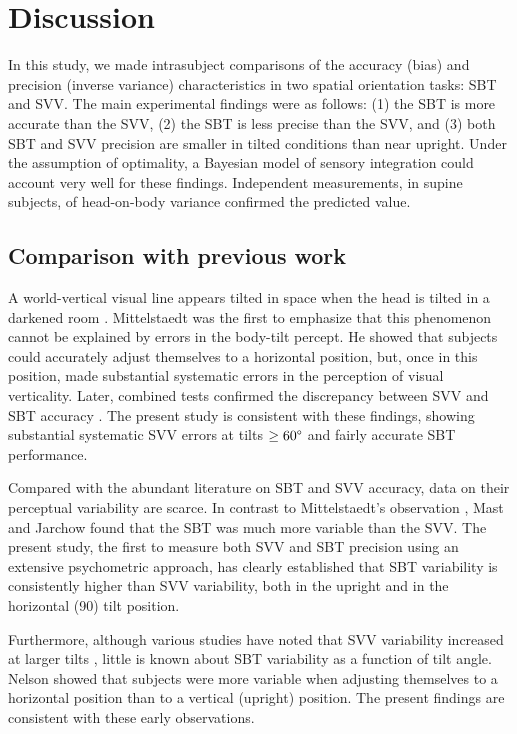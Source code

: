 \section{Discussion}

In this study, we made intrasubject comparisons of the accuracy (bias) and precision (inverse variance) characteristics in two spatial orientation tasks: SBT and SVV. The main experimental findings were as follows: (1) the SBT is more accurate than the SVV, (2) the SBT is less precise than the SVV, and (3) both SBT and SVV precision are smaller in tilted conditions than near upright. Under the assumption of optimality, a Bayesian model of sensory integration could account very well for these findings. Independent measurements, in supine subjects, of head-on-body variance confirmed the predicted value. 


\subsection{Comparison with previous work}
 
A world-vertical visual line appears tilted in space when the head is tilted in a darkened room \cite{aubert1861}. Mittelstaedt \citeyear{mittelstaedt1983} was the first to emphasize that this phenomenon cannot be explained by errors in the body-tilt percept. He showed that subjects could accurately adjust themselves to a horizontal position, but, once in this position, made substantial systematic errors in the perception of visual verticality. Later, combined tests confirmed the discrepancy between SVV and SBT accuracy \cite{mast1996, jarchow1999, vanbeuzekom2000, vanbeuzekom2001, kaptein2004, vingerhoets2008}. The present study is consistent with these findings, showing substantial systematic SVV errors at tilts $\ge60\degree$ and fairly accurate SBT performance. 

Compared with the abundant literature on SBT and SVV accuracy, data on their perceptual variability are scarce. In contrast to Mittelstaedt's observation \citeyear{mittelstaedt1983}, Mast and Jarchow \citeyear{mast1996} found that the SBT was much more variable than the SVV. The present study, the first to measure both SVV and SBT precision using an extensive psychometric approach, has clearly established that SBT variability is consistently higher than SVV variability, both in the upright and in the horizontal (90\textdegree) tilt position. 

Furthermore, although various studies have noted that SVV variability increased at larger tilts \cite{schone1964, schone1968, udodehaes1970, vanbeuzekom2001, devrijer2008}, little is known about SBT variability as a function of tilt angle. Nelson \citeyear{nelson1968} showed that subjects were more variable when adjusting themselves to a horizontal position than to a vertical (upright) position. The present findings are consistent with these early observations. 


